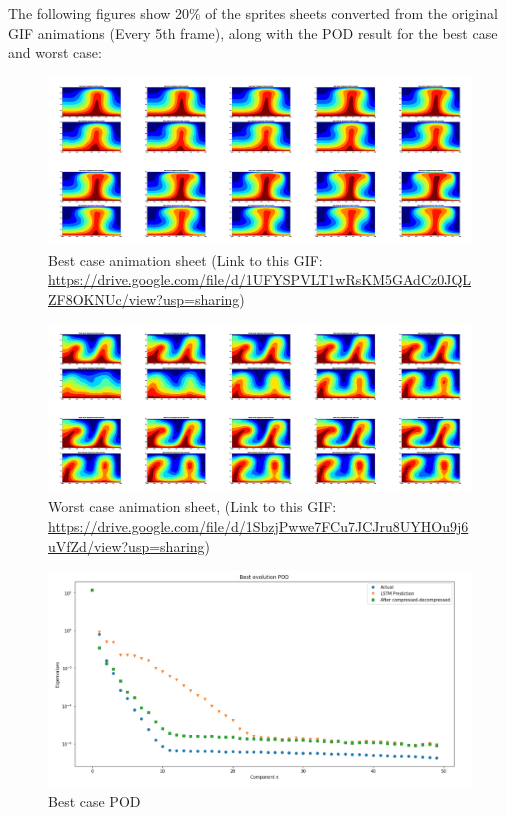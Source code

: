 The following figures show 20\% of the sprites sheets converted from the original GIF animations (Every 5th frame), along with the POD result for the best case and worst case:

\begin{figure}[H]
    \centering
    \caption{Best case animation sheet (Link to this GIF: \url{https://drive.google.com/file/d/1UFYSPVLT1wRsKM5GAdCz0JQLZF8OKNUc/view?usp=sharing})}
    \includegraphics[scale=0.10]{Report LaTeX/figures/mantle_convection_images/larger_dataset/LSTM_Best_GIF_sheet.png}
\end{figure}



\begin{figure}[H]
    \centering
    \caption{Worst case animation sheet, (Link to this GIF: 
    \url{https://drive.google.com/file/d/1SbzjPwwe7FCu7JCJru8UYHOu9j6uVfZd/view?usp=sharing})}
    \includegraphics[scale=0.10]{Report LaTeX/figures/mantle_convection_images/larger_dataset/LSTM_Worst_GIF_sheet.png}
\end{figure}


\begin{figure}[H]
    \caption{Best case POD}
    \includegraphics[scale=0.5]{Report LaTeX/figures/mantle_convection_images/larger_dataset/LSTM_Best_POD.png}
\end{figure}

